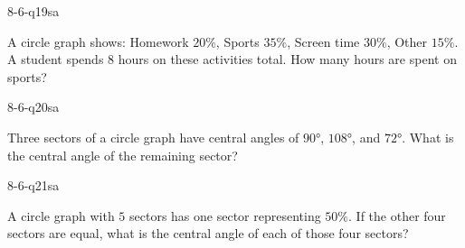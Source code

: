 \begin{practiceQuestion}{8-6-q19}{sa}
\begin{questionText}
A circle graph shows: Homework $20\%$, Sports $35\%$, Screen time $30\%$, Other $15\%$. A student spends $8$ hours on these activities total. How many hours are spent on sports?
\end{questionText}
\end{practiceQuestion}

\begin{practiceQuestion}{8-6-q20}{sa}
\begin{questionText}
Three sectors of a circle graph have central angles of $90°$, $108°$, and $72°$. What is the central angle of the remaining sector?
\end{questionText}
\end{practiceQuestion}

\begin{practiceQuestion}{8-6-q21}{sa}
\begin{questionText}
A circle graph with $5$ sectors has one sector representing $50\%$. If the other four sectors are equal, what is the central angle of each of those four sectors?
\end{questionText}
\end{practiceQuestion}


